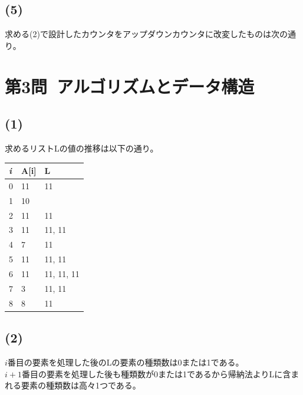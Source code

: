 \documentclass[a4paper,12pt,xelatex,ja=standard]{bxjsarticle}
\begin{document}
\subsection*{(5)}
求める(2)で設計したカウンタをアップダウンカウンタに改変したものは次の通り。

\section*{第3問\ アルゴリズムとデータ構造}
\subsection*{(1)}
求めるリストLの値の推移は以下の通り。
\begin{table}[]
  \begin{tabular}{|l|l|l|}
  \hline
  \textit{i} & A[i] & L            \\ \hline \hline
  0          & 11   & {11}         \\ \hline
  1          & 10   & {}           \\ \hline
  2          & 11   & {11}         \\ \hline
  3          & 11   & {11, 11}     \\ \hline
  4          & 7    & {11}         \\ \hline
  5          & 11   & {11, 11}     \\ \hline
  6          & 11   & {11, 11, 11} \\ \hline
  7          & 3    & {11, 11}     \\ \hline
  8          & 8    & {11}         \\ \hline
  \end{tabular}
\end{table}

\subsection*{(2)}
$i$番目の要素を処理した後のLの要素の種類数は0または1である。\\
$i+1$番目の要素を処理した後も種類数が0または1であるから帰納法よりLに含まれる要素の種類数は高々1つである。
\end{document}
